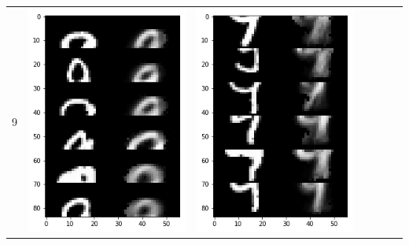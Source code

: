 \documentclass[12pt]{report} %
\begin{document}
\begin{tabular}{m{0.7cm}m{2.4cm}m{2.4cm}m{2.4cm}m{2.4cm}m{2.4cm}m{2.4cm}}
9 & \includegraphics[scale=0.3]{pictures/KE_9_up.png} & \includegraphics[scale=0.3]{pictures/KE_9_down.png} &

\end{tabular}
\end{document}

